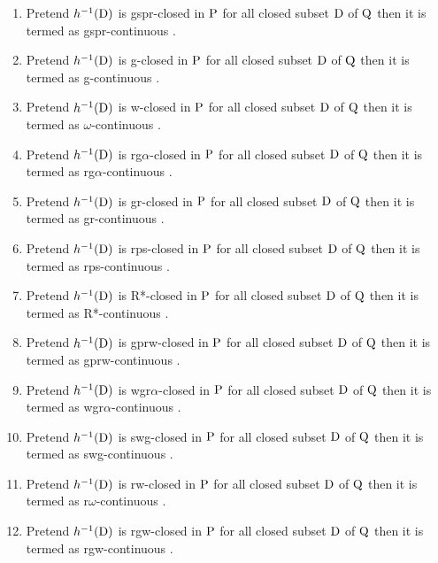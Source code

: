 \begin{dfn}
\begin{enumerate}
\item Pretend $h^{-1}(\mathrm{D})$ is gspr-closed in $\mathrm{P}$ for all closed subset $\mathrm{D}$ of $\mathrm{Q}$ then it is termed as gspr-continuous \cite{key24} . 
\item Pretend $h^{-1}(\mathrm{D})$ is g-closed in $\mathrm{P}$ for all closed subset $\mathrm{D}$ of $\mathrm{Q}$ then it is termed as g-continuous \cite{key7} . 
\item Pretend $h^{-1}(\mathrm{D})$ is w-closed in $\mathrm{P}$ for all closed subset $\mathrm{D}$ of $\mathrm{Q}$ then it is termed as $\omega$-continuous \cite{key27} . 
\item Pretend $h^{-1}(\mathrm{D})$ is rg$\alpha$-closed in $\mathrm{P}$ for all closed subset $\mathrm{D}$ of $\mathrm{Q}$ then it is termed as rg$\alpha$-continuous \cite{key28} . 
\item Pretend $h^{-1}(\mathrm{D})$ is gr-closed in $\mathrm{P}$ for all closed subset $\mathrm{D}$ of $\mathrm{Q}$ then it is termed as gr-continuous \cite{key9} . 
\item Pretend $h^{-1}(\mathrm{D})$ is rps-closed in $\mathrm{P}$ for all closed subset $\mathrm{D}$ of $\mathrm{Q}$ then it is termed as rps-continuous \cite{key25} . 
\item Pretend $h^{-1}(\mathrm{D})$ is R*-closed in $\mathrm{P}$ for all closed subset $\mathrm{D}$ of $\mathrm{Q}$ then it is termed as R*-continuous \cite{key15} . 
\item Pretend $h^{-1}(\mathrm{D})$ is gprw-closed in $\mathrm{P}$ for all closed subset $\mathrm{D}$ of $\mathrm{Q}$ then it is termed as gprw-continuous \cite{key16} . 
\item Pretend $h^{-1}(\mathrm{D})$ is wgr$\alpha$-closed in $\mathrm{P}$ for all closed subset $\mathrm{D}$ of $\mathrm{Q}$ then it is termed as wgr$\alpha$-continuous \cite{key15} . 
\item Pretend $h^{-1}(\mathrm{D})$ is swg-closed in $\mathrm{P}$ for all closed subset $\mathrm{D}$ of $\mathrm{Q}$ then it is termed as swg-continuous \cite{key23} . 
\item Pretend $h^{-1}(\mathrm{D})$ is rw-closed in $\mathrm{P}$ for all closed subset $\mathrm{D}$ of $\mathrm{Q}$ then it is termed as r$\omega$-continuous \cite{key8} . 
\item Pretend $h^{-1}(\mathrm{D})$ is rgw-closed in $\mathrm{P}$ for all closed subset $\mathrm{D}$ of $\mathrm{Q}$ then it is termed as rgw-continuous \cite{key22} . 
\end{enumerate}
\end{dfn}

